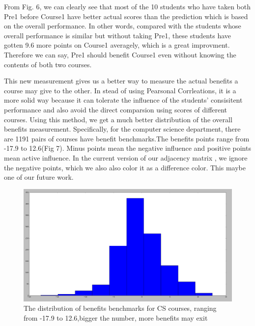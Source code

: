 From Fig. 6, we can clearly see that most of the 10 students who have taken both Pre1 before Course1 have better actual scores than the prediction which is based on the overall performance. In other words, compared with the students whose overall performance is similar but without taking Pre1, these students have gotten 9.6 more points on Course1 averagely, which is a great improvment. Therefore we can say, Pre1 should benefit Course1 even without knowing the contents of both two courses.

This new measurement gives us a better way to measure the actual benefits a course may give to the other. In stead of using Pearsonal Corrleations, it is a more solid way because it can tolerate the influence of the students’ consisitent performance and also avoid the direct comparsion using scores of different courses. Using this method, we get a much better distribution of the overall benefits measurement. Specifically,  for the computer science department, there are 1191 pairs of courses have benefit benchmarks.The benefits points range from -17.9 to 12.6(Fig 7). Minus points mean the negative influence and positive points mean active influence. In the current version of our adjacency matrix , we ignore the negative points, which we also also color it as a difference color. This maybe one of our future work.
\begin{figure}[h]
	\centering %
	\includegraphics[width=\columnwidth]{figs/markdistribution} 
	\caption{The distribution of benefits benchmarks for CS courses, ranging from -17.9 to 12.6,bigger the number, more benefits may exit}
	\label{fig:sample}
\end{figure}

